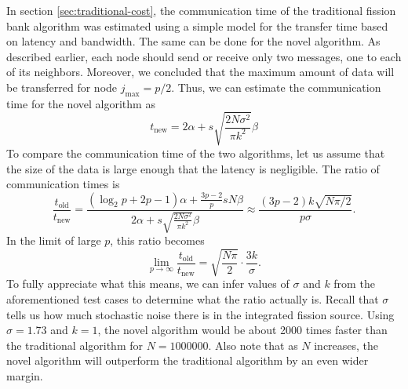 In section \ref{sec:traditional-cost}, the communication time of the
traditional fission bank algorithm was estimated using a simple model
for the transfer time based on latency and bandwidth. The same can be
done for the novel algorithm. As described earlier, each node should
send or receive only two messages, one to each of its
neighbors. Moreover, we concluded that the maximum amount of data will
be transferred for node $j_{\text{max}} = p/2$. Thus, we can estimate
the communication time for the novel algorithm as
\begin{equation}
  t_{\text{new}} = 2\alpha + s\sqrt{\frac{2N\sigma^2}{\pi k^2}} \beta
\end{equation}
To compare the communication time of the two algorithms, let us assume
that the size of the data is large enough that the latency is
negligible. The ratio of communication times is
\begin{equation}
  \frac{t_{\text{old}}}{t_{\text{new}}} = \frac{\left ( \log_2 p + 2p
    - 1 \right ) \alpha + \frac{3p-2}{p} sN\beta}{2\alpha +
    s\sqrt{\frac{2N\sigma^2}{\pi k^2}} \beta} \approx \frac{ \left (
    3p - 2 \right ) k \sqrt{N\pi/2}}{ p\sigma }.
\end{equation}
In the limit of large $p$, this ratio becomes
\begin{equation}
  \lim_{p\rightarrow\infty} \frac{t_{\text{old}}}{t_{\text{new}}} =
  \sqrt{\frac{N\pi}{2}} \cdot \frac{3k}{\sigma}.
\end{equation}
To fully appreciate what this means, we can infer values of $\sigma$
and $k$ from the aforementioned test cases to determine what the ratio
actually is. Recall that $\sigma$ tells us how much stochastic noise
there is in the integrated fission source. Using $\sigma = 1.73$ and
$k = 1$, the novel algorithm would be about 2000 times faster than the
traditional algorithm for $N = 1000000$. Also note that as $N$
increases, the novel algorithm will outperform the traditional
algorithm by an even wider margin.

